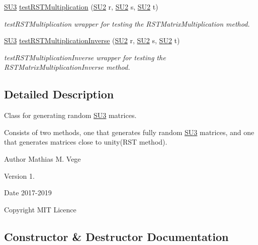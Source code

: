 \begin{DoxyCompactItemize}
\mbox{\hyperlink{class_s_u3}{S\+U3}} \mbox{\hyperlink{class_s_u3_matrix_generator_a05a57d1d429dc2c31d79ccf2de5efeee}{test\+R\+S\+T\+Multiplication}} (\mbox{\hyperlink{class_s_u2}{S\+U2}} r, \mbox{\hyperlink{class_s_u2}{S\+U2}} s, \mbox{\hyperlink{class_s_u2}{S\+U2}} t)
\begin{DoxyCompactList}\small\item\em test\+R\+S\+T\+Multiplication wrapper for testing the R\+S\+T\+Matrix\+Multiplication method. \end{DoxyCompactList}\item 
\mbox{\hyperlink{class_s_u3}{S\+U3}} \mbox{\hyperlink{class_s_u3_matrix_generator_a725f8c7882366bda7316a92c82cf4680}{test\+R\+S\+T\+Multiplication\+Inverse}} (\mbox{\hyperlink{class_s_u2}{S\+U2}} r, \mbox{\hyperlink{class_s_u2}{S\+U2}} s, \mbox{\hyperlink{class_s_u2}{S\+U2}} t)
\begin{DoxyCompactList}\small\item\em test\+R\+S\+T\+Multiplication\+Inverse wrapper for testing the R\+S\+T\+Matrix\+Multiplication\+Inverse method. \end{DoxyCompactList}\end{DoxyCompactItemize}


\subsection{Detailed Description}
Class for generating random \mbox{\hyperlink{class_s_u3}{S\+U3}} matrices. 

Consists of two methods, one that generates fully random \mbox{\hyperlink{class_s_u3}{S\+U3}} matrices, and one that generates matrices close to unity(\+R\+S\+T method).

\begin{DoxyAuthor}{Author}
Mathias M. Vege 
\end{DoxyAuthor}
\begin{DoxyVersion}{Version}
1. 
\end{DoxyVersion}
\begin{DoxyDate}{Date}
2017-\/2019 
\end{DoxyDate}
\begin{DoxyCopyright}{Copyright}
M\+IT Licence 
\end{DoxyCopyright}


\subsection{Constructor \& Destructor Documentation}
\mbox{\label{class_s_u3_matrix_generator_ae76a62a4ba6af03901a0cc8e8632e856}} 
